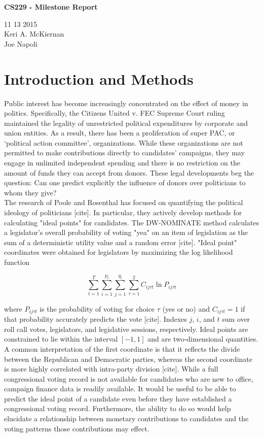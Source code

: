 \documentclass[10]{article}
\begin{document}
\begin{center}
\huge{\textbf{CS229 - Milestone Report}} \\
\end{center}
\begin{center}
\normalsize{11 13 2015} \\

Keri A. McKiernan \\
Joe Napoli
\end{center}
\section*{Introduction and Methods}
Public interest has become increasingly concentrated on the effect of money in politics. Specifically, the Citizens United v. FEC Supreme Court ruling maintained the legality of unrestricted political expenditures by corporate and union entities. As a result, there has been a proliferation of super PAC, or `political action committee',  organizations. While these organizations are not permitted to make contributions directly to candidates’ campaigns, they may engage in unlimited independent spending and there is no restriction on the amount of funds they can accept from donors. These legal developments beg the question: Can one predict explicitly the influence of donors over politicians to whom they give? \\

The research of Poole and Rosenthal has focused on quantifying the political ideology of politicians [cite]. In particular, they actively develop methods for calculating "ideal points" for candidates. The DW-NOMINATE method calculates a legislator’s overall probability of voting "yea" on an item of legislation as the sum of a deterministic utility value and a random error [cite]. "Ideal point" coordinates were obtained for legislators by maximizing the log likelihood function

\[ \sum_{t=1}^{T} \sum_{i=1}^{p_t} \sum_{j=1}^{q_t} \sum_{\tau = 1}^{2} C_{ij \tau t} \ln P_{ij \tau t} \]

\noindent where $P_{ij \tau t}$ is the probability of voting for choice $\tau$ (yes or no) and $C_{ij \tau t} = 1$ if that probability accurately predicts the vote [cite]. Indexes $j$, $i$, and $t$ sum over roll call votes, legislators, and legislative sessions, respectively. Ideal points are constrained to lie within the interval $\left[ -1,1 \right]$ and are two-dimensional quantities. A common interpretation of the first coordinate is that it reflects the divide between the Republican and Democratic parties, whereas the second coordinate is more highly correlated with intra-party division [cite]. While a full congressional voting record is not available for candidates who are new to office, campaign finance data is readily available. It would be useful to be able to predict the ideal point of a candidate even before they have established a congressional voting record. Furthermore, the ability to do so would help elucidate a relationship between monetary contributions to candidates and the voting patterns those contributions may effect.\\
\end{document}

